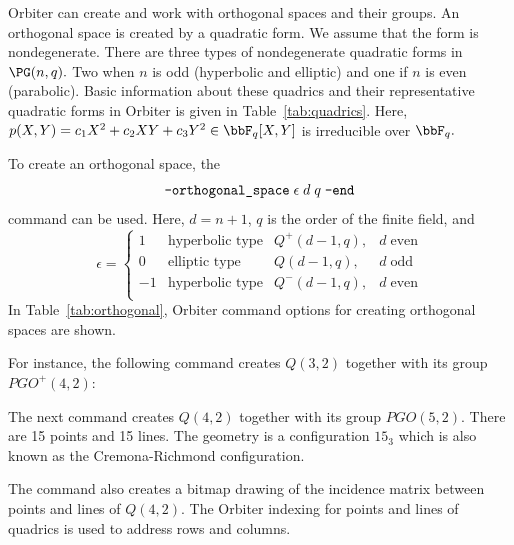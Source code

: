 Orbiter can create and work with orthogonal spaces and their groups.
An orthogonal space is created by a quadratic form. 
We assume that the form is nondegenerate.
There are three types of nondegenerate quadratic forms in $\PG(n,q).$ 
Two when $n$ is odd (hyperbolic and elliptic) 
and one if $n$ is even (parabolic).
Basic information about these quadrics 
and their representative quadratic forms in Orbiter 
is given in Table~\ref{tab:quadrics}.
Here, $p(X,Y)=c_1X^2+ c_2XY+c_3Y^2 \in \bbF_q[X,Y]$ 
is irreducible over $\bbF_q.$ 

%


To create an orthogonal space, the 
$$
\verb'-orthogonal_space' \; \epsilon \; d \; q \; \verb'-end'
$$
command can be used. 
Here, $d = n + 1$, $q$ is the order of the finite field, and  
$$
\epsilon = 
\left\{
\begin{array}{cccc}
1 & \mbox{hyperbolic type} & Q^+(d-1,q), &  d \; \mbox{even} \\
0 & \mbox{elliptic type} & Q(d-1,q), & d \; \mbox{odd} \\
-1 & \mbox{hyperbolic type} & Q^-(d-1,q),& d \; \mbox{even} \\
\end{array}
\right.
$$
In Table~\ref{tab:orthogonal}, 
Orbiter command options for creating orthogonal spaces are shown.

\bigskip

For instance, the following command creates $Q(3,2)$ 
together with its group $PGO^+(4,2)$:



\bigskip

The next command creates $Q(4,2)$ together with its group $PGO(5,2)$. 
There are 15 points and 15 lines.
The geometry is a configuration $15_3$ which is also 
known as the Cremona-Richmond configuration.


The command also 
creates a bitmap drawing of the incidence matrix 
between points and lines of $Q(4,2).$
The Orbiter indexing for points and lines of quadrics 
is used to address rows and columns.





\bigskip



